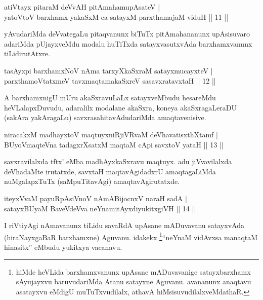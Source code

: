 \begin{shl}
atiVtayx pitaraM deVvAH pitAmahamupAsateV | \\
yatoV\s toV barxhamx yakaSxM ca satayxM parxthamajaM viduH \hfill ||  11 || 
\end{shl}

\begin{artha}
yAvudariMda deVvategaLu pitaqvanunx biTuTx pitAmahananunx upAsisuvaro adariMda pUjayxveMdu modalu huTiTxda satayxvasutxvAda barxhamxvanunx tiLidirutAtxre.
\end{artha}


\begin{shl}
tasAyxpi barxhamxNoV nAma tarxyXkaSxraM satayxmucayxteV | \\
parxthamoVtatxmeV tavxmaqtamakaSxreV sasavxratavxtaH \hfill ||  12 || 
\end{shl}

\begin{artha}
A barxhamxnigU mUru akaSxravuLaLx satayxveMbudu hesareMdu heVLalapxDuvudu, adaralilx modalane akaSxra, koneya akaSxragaLeraDU (sakAra yakAragaLu) savxrasahitavAdudariMda amaqtavenisive.
\end{artha}

\begin{shl}
niracakxM madhayxtoV maqtuyxniRjiVRvaM deVhavatisxthXtamf | \\
BUyoV\s maqteVna tadagxrXsatxM maqtaM cApi savxtoV yataH \hfill ||  13 || 
\end{shl}

\begin{artha}
savxravilalxda tftx' eMba madhAyxkaSxravu maqtuyx. adu jiVvavilalxda deVhadaMte irutatxde, savxtaH maqtavAgidadxrU amaqtagaLiMda nuMgalapxTuTx (saMpuTitavAgi) amaqtavAgirutatxde.
\end{artha}

\begin{shl}
iteyxVvaM payuRpAsiVnoV nAmABijocnxV naraH sadA | \\
satayxBUyaM BaveVdeVva neYnamitAyxdiyukitxgiVH \hfill ||  14 || 
\end{shl}

\begin{artha}
I riVtiyAgi nAmavanunx tiLidu savaRdA upAsane mADuvavanu satayxvAda (hiraNayxgaBaR barxhamxne) Aguvanu. idakekx \footnote{hiMde heVLida barxhamxvanunx upAsane mADuvavanige satayxbarxhamx sAyujayxvu baruvudariMda Atanu satayxne Aguvanu. avananunx anaqtavu asatayxvu eMdigU muTuTxvudilalx, athavA hiMsisuvudilalxveMdathaR.}``neYnaM vidAvxsa manaqtaM hinasitx'' eMbudu yukitxya vacanavu.
\end{artha}

